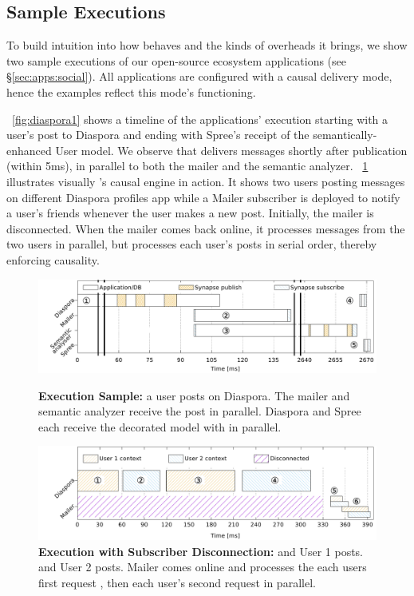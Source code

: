 \subsection{Sample Executions}
\label{sec:evaluation:sample-runs}

To build intuition into how \synapse behaves and the kinds of overheads it
brings, we show two sample executions of our open-source ecosystem
applications (see \S\ref{sec:apps:social}). All applications are configured
with a causal delivery mode, hence the examples reflect this mode's functioning.

\F~\ref{fig:diaspora1} shows a timeline of the applications' execution
starting with a user's post to Diaspora and ending with Spree's receipt of the
semantically-enhanced User model. We observe that \synapse delivers messages
shortly after publication (within 5ms), in parallel to both the mailer and
the semantic analyzer.  \F~\ref{fig:diaspora2}  illustrates visually
\synapse's causal engine in action. It shows two users posting messages on
different Diaspora profiles app while a Mailer subscriber is deployed to notify
a user's friends whenever the user makes a new post.  Initially, the mailer is
disconnected. When the mailer comes back online, it processes messages from the
two users in parallel, but processes each user's posts in serial order, thereby
enforcing causality.


\begin{figure}
  \centering
  \includegraphics[width=\linewidth]{figures/synapse/diaspora1.pdf}
  \caption{{\bf Execution Sample:}
      a user posts on Diaspora. The mailer  and semantic
     analyzer  receive the post in parallel. Diaspora  and Spree
      each receive the decorated model with in parallel.}
  \label{fig:diaspora1}

  \vspace{4em}

  \includegraphics[width=\linewidth]{figures/synapse/diaspora2.pdf}
  \caption{{\bf Execution with Subscriber Disconnection:}
     and  User 1 posts.  and  User 2 posts.
    Mailer comes online and processes the each users first request , then
  each user's second request  in parallel.}
  \label{fig:diaspora2}
\end{figure}

